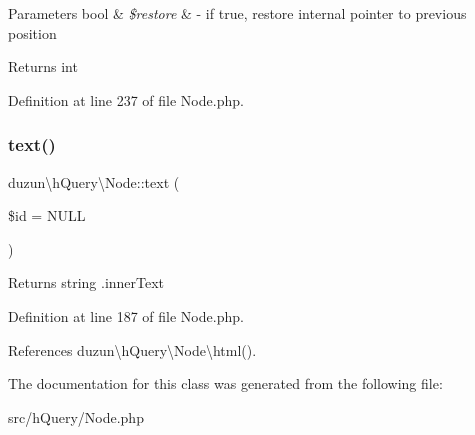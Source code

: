 \begin{DoxyParams}[1]{Parameters}
bool & {\em \$restore} & -\/ if true, restore internal pointer to previous position\\
\hline
\end{DoxyParams}
\begin{DoxyReturn}{Returns}
int 
\end{DoxyReturn}


Definition at line 237 of file Node.\+php.

\mbox{\label{classduzun_1_1hQuery_1_1Node_ad5395ffe77dd4f111fcc7f59d211fbfa}} 
\subsubsection{\texorpdfstring{text()}{text()}}
{\footnotesize\ttfamily duzun\textbackslash{}h\+Query\textbackslash{}\+Node\+::text (\begin{DoxyParamCaption}\item[{}]{\$id = {\ttfamily NULL} }\end{DoxyParamCaption})}

\begin{DoxyReturn}{Returns}
string .inner\+Text 
\end{DoxyReturn}


Definition at line 187 of file Node.\+php.



References duzun\textbackslash{}h\+Query\textbackslash{}\+Node\textbackslash{}html().



The documentation for this class was generated from the following file\+:\begin{DoxyCompactItemize}
\item 
src/h\+Query/Node.\+php\end{DoxyCompactItemize}
